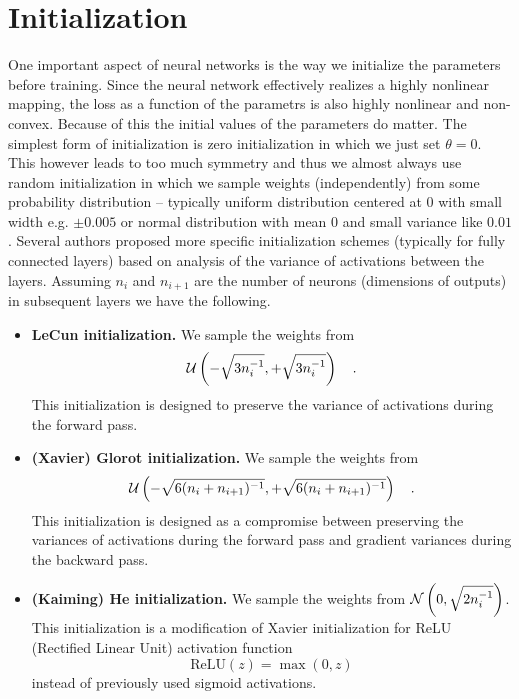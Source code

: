 \documentclass{myclass}
\begin{document}
\section{Initialization}

One important aspect of neural networks is the way we initialize the parameters before training.
Since the neural network effectively realizes a highly nonlinear mapping, the loss as a function of
the parametrs is also highly nonlinear and non-convex. Because of this the initial values of the
parameters do matter. The simplest form of initialization is zero initialization in which we just
set \(\theta = 0\). This however leads to too much symmetry and thus we almost always use random
initialization in which we sample weights (independently) from some probability distribution --
typically uniform distribution centered at 0 with small width e.g. \(\pm0.005\) or normal
distribution with mean 0 and small variance like \(0.01\). Several authors proposed more specific
initialization schemes (typically for fully connected layers) based on analysis of the variance of
activations between the layers. Assuming \(n_i\) and \(n_{i+1}\) are the number of neurons
(dimensions of outputs) in subsequent layers we have the following.

\begin{itemize}
   \item \textbf{LeCun initialization.} We sample the weights from
   \[
      \mathcal{U}\left(-\sqrt{3n_{i}^{-1}}, +\sqrt{3n_{i}^{-1}}\right) \quad.
   \]
   This initialization is designed to preserve the variance of activations during the forward pass.
   
   \item \textbf{(Xavier) Glorot initialization.} We sample the weights from
   \[
      \mathcal{U}\left(-\sqrt{6(n_{i} + n_{i+1})^{-1}}, +\sqrt{6(n_{i} + n_{i+1})^{-1}}\right) \quad.
   \]
   This initialization is designed as a compromise between preserving the variances of activations
   during the forward pass and gradient variances during the backward pass.
   
   \item \textbf{(Kaiming) He initialization.} We sample the weights from \(\mathcal{N}\left(0, \sqrt{2
   n_{i}^{-1}}\right)\). This initialization is a modification of Xavier initialization for ReLU
   (Rectified Linear Unit) activation function
   \[\boxed{
      \text{ReLU}(z) = \max(0, z)
   }
   \]
   instead of previously used sigmoid activations.
\end{itemize}
\end{document}
